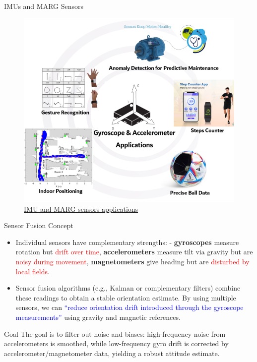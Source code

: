 \documentclass[aspectratio=169,xcolor=dvipsnames]{beamer}
\begin{document}
\begin{frame}{IMUs and MARG Sensors}
\hfill
\begin{figure}
    \centering
    \includegraphics[width=0.55\linewidth]{logos/IMU-Applications-EN-768x671.png}
    \caption{\href{https://atadiat.com/en/e-towards-understanding-imu-basics-of-accelerometer-and-gyroscope-sensors/}{IMU and MARG sensors applications}}
    \label{fig:imuapp}
\end{figure}
\hfill
\end{frame}


\begin{frame}{Sensor Fusion Concept}
\begin{itemize}
  \item Individual sensors have complementary strengths: 
    - \textbf{gyroscopes} measure rotation but \textcolor{red}{drift over time}, \textbf{accelerometers} measure tilt via gravity but are \textcolor{red}{noisy during movement}, \textbf{magnetometers} give heading but are \textcolor{red}{disturbed by local fields}.
  \item Sensor fusion algorithms (e.g., Kalman\cite{EKF}\cite{doubleEKF}\cite{quatEKF} or complementary filters\cite{compfilter}) combine these readings to obtain a stable orientation estimate. By using multiple sensors, we can \textcolor{blue}{“reduce orientation drift introduced through the gyroscope measurements”} using gravity and magnetic references.
\end{itemize}
\begin{block}{Goal}
    The goal is to filter out noise and biases: high-frequency noise from accelerometers is smoothed, while low-frequency gyro drift is corrected by accelerometer/magnetometer data, yielding a robust attitude estimate.
\end{block}
\end{frame}
\end{document}
